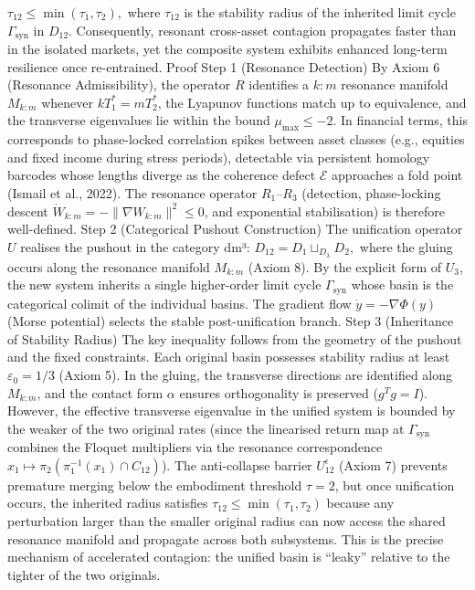 $   \tau_{12} \le \min(\tau_1, \tau_2),   $
where $  \tau_{12}  $ is the stability radius of the inherited limit cycle $  \Gamma_{\text{syn}}  $ in $  D_{12}  $. Consequently, resonant cross-asset contagion propagates faster than in the isolated markets, yet the composite system exhibits enhanced long-term resilience once re-entrained.
Proof
Step 1 (Resonance Detection)
By Axiom 6 (Resonance Admissibility), the operator $  R  $ identifies a $  k:m  $ resonance manifold $  M_{k:m}  $ whenever $  k T_1^* = m T_2^*  $, the Lyapunov functions match up to equivalence, and the transverse eigenvalues lie within the bound $  \mu_{\max} \le -2  $. In financial terms, this corresponds to phase-locked correlation spikes between asset classes (e.g., equities and fixed income during stress periods), detectable via persistent homology barcodes whose lengths diverge as the coherence defect $  \mathcal{E}  $ approaches a fold point (Ismail et al., 2022). The resonance operator $  R_1  $–$  R_3  $ (detection, phase-locking descent $  \dot{W}_{k:m} = -\|\nabla W_{k:m}\|^2 \le 0  $, and exponential stabilisation) is therefore well-defined.
Step 2 (Categorical Pushout Construction)
The unification operator $  U  $ realises the pushout in the category dm³:
$   D_{12} = D_1 \sqcup_{D_\lambda} D_2,   $
where the gluing occurs along the resonance manifold $  M_{k:m}  $ (Axiom 8). By the explicit form of $  U_3  $, the new system inherits a single higher-order limit cycle $  \Gamma_{\text{syn}}  $ whose basin is the categorical colimit of the individual basins. The gradient flow $  \dot{y} = -\nabla \Phi(y)  $ (Morse potential) selects the stable post-unification branch.
Step 3 (Inheritance of Stability Radius)
The key inequality follows from the geometry of the pushout and the fixed constraints. Each original basin possesses stability radius at least $  \varepsilon_0 = 1/3  $ (Axiom 5). In the gluing, the transverse directions are identified along $  M_{k:m}  $, and the contact form $  \alpha  $ ensures orthogonality is preserved ($  g^T g = I  $). However, the effective transverse eigenvalue in the unified system is bounded by the weaker of the two original rates (since the linearised return map at $  \Gamma_{\text{syn}}  $ combines the Floquet multipliers via the resonance correspondence $  x_1 \mapsto \pi_2(\pi_1^{-1}(x_1) \cap C_{12})  $). The anti-collapse barrier $  U_{12}^\epsilon  $ (Axiom 7) prevents premature merging below the embodiment threshold $  \tau = 2  $, but once unification occurs, the inherited radius satisfies
$   \tau_{12} \le \min(\tau_1, \tau_2)   $
because any perturbation larger than the smaller original radius can now access the shared resonance manifold and propagate across both subsystems. This is the precise mechanism of accelerated contagion: the unified basin is “leaky” relative to the tighter of the two originals.
